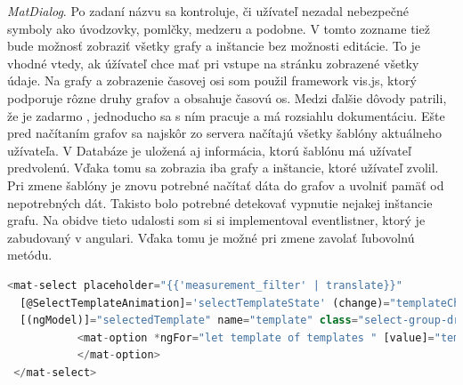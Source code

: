 \documentclass[11pt, oneside]{report}
\begin{document}
\textit{MatDialog}. Po zadaní názvu sa kontroluje, či užívateľ nezadal nebezpečné symboly ako úvodzovky, pomlčky, medzeru  a podobne. V tomto zozname tiež bude možnosť zobraziť všetky grafy a inštancie bez možnosti editácie. To je vhodné vtedy, ak úžívateľ chce mať pri vstupe na stránku zobrazené všetky údaje.  Na grafy a zobrazenie časovej osi som použil framework vis.js, ktorý podporuje rôzne druhy grafov a obsahuje časovú os. Medzi ďalšie dôvody patrili, že je zadarmo , jednoducho sa s ním pracuje a má rozsiahlu dokumentáciu.  Ešte pred načítaním grafov sa  najskôr zo servera načítajú všetky šablóny aktuálneho užívateľa. V Databáze je uložená aj informácia, ktorú šablónu má užívateľ predvolenú. Vďaka tomu sa zobrazia iba grafy a inštancie, ktoré užívateľ zvolil. Pri zmene šablóny je znovu potrebné načítať dáta do grafov a uvolniť pamäť od nepotrebných dát. Takisto bolo potrebné detekovať vypnutie nejakej inštancie grafu. Na obidve tieto udalosti som si si implementoval eventlistner, ktorý je zabudovaný v angulari. Vďaka tomu je možné pri zmene zavolať ľubovolnú metódu. 
\begin{lstlisting}[language=Javascript,showstringspaces=false,label=angular1,caption=SelectList pre zvolenie šablóny s využitím nástrojov angularu,captionpos=b]
 <mat-select placeholder="{{'measurement_filter' | translate}}"
  [@SelectTemplateAnimation]='selectTemplateState' (change)="templateChanged()"
  [(ngModel)]="selectedTemplate" name="template" class="select-group-dropdown">
           <mat-option *ngFor="let template of templates " [value]="template">               
           </mat-option>
 </mat-select>
\end{lstlisting}
\end{document}
